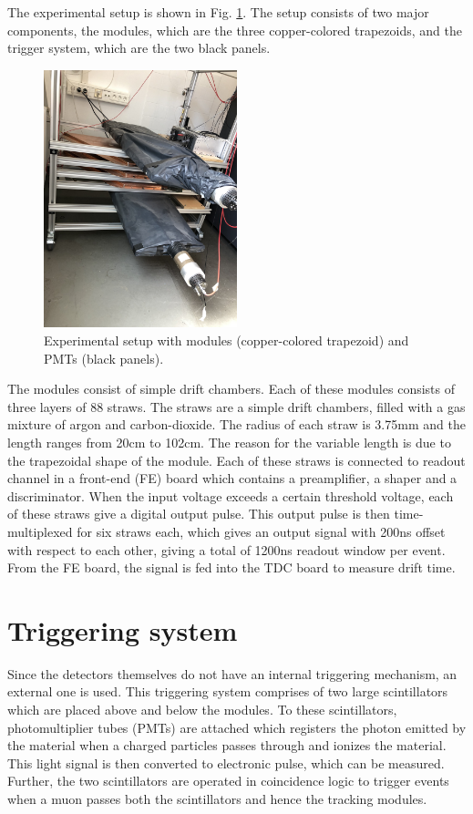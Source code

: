 \documentclass[a4paper]{report}
\numberwithin{equation}{section}
\begin{document}
The experimental setup is shown in Fig. \ref{fig:setup1}. The setup consists of two major components, the modules, which are the three copper-colored trapezoids, and the trigger system, which are the two black panels. 

\begin{figure}[htpb]
    \centering
    \includegraphics[width=0.5\textwidth]{setup1.jpg}
    \caption{Experimental setup with modules (copper-colored trapezoid) and PMTs (black panels).}
    \label{fig:setup1}
\end{figure}	

The modules consist of simple drift chambers. Each of these modules consists of three layers of 88 straws. The straws are a simple drift chambers, filled with a gas mixture of argon and carbon-dioxide. The radius of each straw is 3.75mm and the length ranges from 20cm to 102cm. The reason for the variable length is due to the trapezoidal shape of the module. Each of these straws is connected to readout channel in a front-end (FE) board which contains a preamplifier, a shaper and a discriminator. When the input voltage exceeds a certain threshold voltage, each of these straws give a digital output pulse. This output pulse is then time-multiplexed for six straws each, which gives an output signal with 200ns offset with respect to each other, giving a total of 1200ns readout window per event. From the FE board, the signal is fed into the TDC board to measure drift time.  

\section{Triggering system}
Since the detectors themselves do not have an internal triggering mechanism, an external one is used. This triggering system comprises of two large scintillators which are placed above and below the modules. To these scintillators, photomultiplier tubes (PMTs) are attached which registers the photon emitted by the material when a charged particles passes through and ionizes the material. This light signal is then converted to electronic pulse, which can be measured. Further, the two scintillators are operated in coincidence logic to trigger events when a muon passes both the scintillators and hence the tracking modules. 
\end{document}
